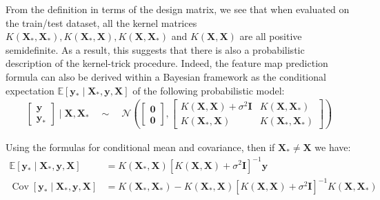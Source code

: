 \documentclass[11pt]{article}
\theoremstyle{plain} %
\theoremstyle{remark}
\begin{document}
From the definition in terms of the design matrix, we see that when
evaluated on the train/test dataset, all the kernel matrices
$K\left(\mathbf{X}_{*}, \mathbf{X}_{*}\right), K\left(\mathbf{X}_{*},
  \mathbf{X}\right), K\left(\mathbf{X}, \mathbf{X}_{*}\right)$ and $K(\mathbf{X},
  \mathbf{X})$ are all positive semidefinite. As a result, this suggests that
there is also a probabilistic description of the kernel-trick procedure. Indeed,
the feature map prediction formula can also be derived within a Bayesian
framework as the conditional expectation $\mathbb{E}\left[\mathbf{y}_{*} \mid
    \mathbf{X}_{*}, \mathbf{y}, \mathbf{X}\right]$ of the following probabilistic
model:
\begin{align}
  \begin{bmatrix}
    \mathbf{y} \\
    \mathbf{y}_{*}
  \end{bmatrix} \mid \mathbf{X}, \mathbf{X}_{*}
  \quad \sim \quad
  \mathcal{N}\left(\begin{bmatrix}
                       \boldsymbol{0} \\
                       \boldsymbol{0}
                     \end{bmatrix},
  \begin{bmatrix}
      K(\mathbf{X}, \mathbf{X})+\sigma^{2} \mathbf{I} & K\left(\mathbf{X}, \mathbf{X}_{*}\right)     \\
      K\left(\mathbf{X}_{*}, \mathbf{X}\right)        & K\left(\mathbf{X}_{*}, \mathbf{X}_{*}\right)
    \end{bmatrix}\right)
  \label{eq:kernel as Gaussian Field}
\end{align}

Using the formulas for conditional mean and covariance, then if $\mathbf{X}_{*}
  \neq \mathbf{X}$ we have:
\begin{equation}
  \begin{aligned}
    \mathbb{E}\left[\mathbf{y}_{*} \mid \mathbf{X}_{*}, \mathbf{y}, \mathbf{X}\right]         & =K\left(\mathbf{X}_{*}, \mathbf{X}\right)\left[K(\mathbf{X}, \mathbf{X})+\sigma^{2} \mathbf{I}\right]^{-1} \mathbf{y}                                                                             \\
    \operatorname{Cov}\left[\mathbf{y}_{*} \mid \mathbf{X}_{*}, \mathbf{y}, \mathbf{X}\right] & =K\left(\mathbf{X}_{*}, \mathbf{X}_{*}\right) -K\left(\mathbf{X}_{*}, \mathbf{X}\right)\left[K(\mathbf{X}, \mathbf{X})+\sigma^{2} \mathbf{I}\right]^{-1} K\left(\mathbf{X}, \mathbf{X}_{*}\right)
  \end{aligned}
  \label{eq: posterior predictive distribution}
\end{equation}
\end{document}
